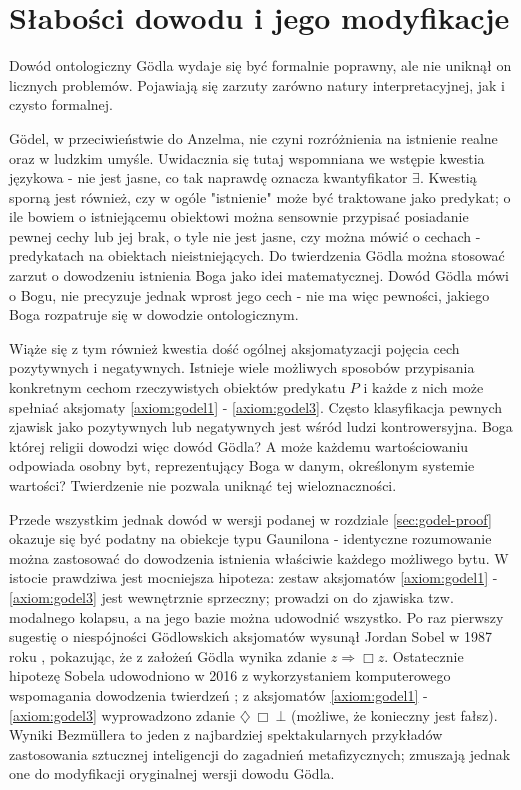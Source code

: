\documentclass{article}
\begin{document}
\section{Słabości dowodu i jego modyfikacje} \label{sec:anderson-proof}
Dowód ontologiczny Gödla wydaje się być formalnie poprawny, ale nie uniknął on licznych problemów. Pojawiają się zarzuty zarówno natury interpretacyjnej, jak i czysto formalnej. 

Gödel, w przeciwieństwie do Anzelma, nie czyni rozróżnienia na istnienie realne oraz w ludzkim umyśle. Uwidacznia się tutaj wspomniana we wstępie kwestia językowa - nie jest jasne, co tak naprawdę oznacza kwantyfikator $\exists$. Kwestią sporną jest również, czy w ogóle "istnienie" może być traktowane jako predykat; o ile bowiem o istniejącemu obiektowi można sensownie przypisać posiadanie pewnej cechy lub jej brak, o tyle nie jest jasne, czy można mówić o cechach - predykatach na obiektach nieistniejących. Do twierdzenia Gödla można stosować zarzut o dowodzeniu istnienia Boga jako idei matematycznej. Dowód Gödla mówi o Bogu, nie precyzuje jednak wprost jego cech - nie ma więc pewności, jakiego Boga rozpatruje się w dowodzie ontologicznym. 

Wiąże się z tym również kwestia dość ogólnej aksjomatyzacji pojęcia cech pozytywnych i negatywnych. Istnieje wiele możliwych sposobów przypisania konkretnym cechom rzeczywistych obiektów predykatu $P$ i każde z nich może spełniać aksjomaty \ref{axiom:godel1} - \ref{axiom:godel3}. Często klasyfikacja pewnych zjawisk jako pozytywnych lub negatywnych jest wśród ludzi kontrowersyjna. Boga której religii dowodzi więc dowód Gödla? A może każdemu wartościowaniu odpowiada osobny byt, reprezentujący Boga w danym, określonym systemie wartości? Twierdzenie nie pozwala uniknąć tej wieloznaczności. 

Przede wszystkim jednak dowód w wersji podanej w rozdziale \ref{sec:godel-proof} okazuje się być podatny na obiekcje typu Gaunilona - identyczne rozumowanie można zastosować do dowodzenia istnienia właściwie każdego możliwego bytu. W istocie prawdziwa jest mocniejsza hipoteza: zestaw aksjomatów \ref{axiom:godel1} - \ref{axiom:godel3} jest wewnętrznie sprzeczny; prowadzi on do zjawiska tzw. modalnego kolapsu, a na jego bazie można udowodnić wszystko. Po raz pierwszy sugestię o niespójności Gödlowskich aksjomatów wysunął Jordan Sobel w 1987 roku \cite{sobel1987}, pokazując, że z założeń Gödla wynika zdanie $z\Rightarrow\Box z$. Ostatecznie hipotezę Sobela udowodniono w 2016 z wykorzystaniem komputerowego wspomagania dowodzenia twierdzeń \cite{Benzmuller2016}; z aksjomatów  \ref{axiom:godel1} - \ref{axiom:godel3} wyprowadzono zdanie $\diamondsuit\ \Box\ \bot$ (możliwe, że konieczny jest fałsz). Wyniki Bezmüllera to jeden z najbardziej spektakularnych przykładów zastosowania sztucznej inteligencji do zagadnień metafizycznych; zmuszają jednak one do modyfikacji oryginalnej wersji dowodu Gödla. 
\end{document}
